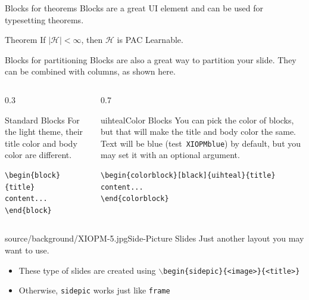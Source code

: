 \documentclass{beamer}
\newcommand{\testcolor}[1]{\colorbox{#1}{\textcolor{#1}{test}}~\texttt{#1}}
\begin{document}
\begin{frame}[fragile]{Blocks for theorems}
Blocks are a great UI element and can be used for typesetting theorems.
\begin{block}{Theorem}
If $\mid \mathcal{H} \mid < \infty$, then $\mathcal{H}$ is PAC Learnable.
\end{block}
\end{frame}

\begin{frame}[fragile]{Blocks for partitioning}
Blocks are also a great way to partition your slide. They can be combined with columns, as shown here.
\begin{columns}
\begin{column}{0.3\textwidth}
\begin{block}{Standard Blocks}
For the light theme, their title color and body color are different. 
\begin{verbatim}
\begin{block}{title}
content...
\end{block}
\end{verbatim}
\end{block}
\end{column}
\begin{column}{0.7\textwidth}
\begin{colorblock}[black]{uihteal}{Color Blocks}
You can pick the color of blocks, but that will make the title and body color the same. Text will be blue (\testcolor{XIOPMblue}) by 
default, but you may set it with an optional argument.
\small
\begin{verbatim}
\begin{colorblock}[black]{uihteal}{title}
content...
\end{colorblock}
\end{verbatim}
\end{colorblock}
\end{column}
\end{columns}
\end{frame}

\begin{sidepic}{source/background/XIOPM-5.jpg}{Side-Picture Slides}
Just another layout you may want to use.
\begin{itemize}
\item These type of slides are created using \texttt{$\backslash$begin\{sidepic\}\{<image>\}\{<title>\}}
\item Otherwise, \texttt{sidepic} works just like \texttt{frame}
\end{itemize}
\end{sidepic}
\end{document}
